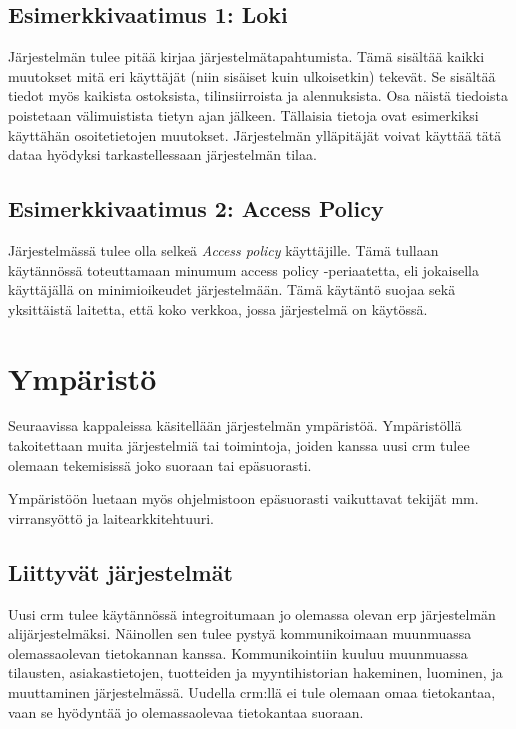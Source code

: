     \subsection{Esimerkkivaatimus 1: Loki}
        Järjestelmän tulee pitää kirjaa järjestelmätapahtumista. Tämä sisältää kaikki muutokset mitä eri käyttäjät (niin sisäiset kuin ulkoisetkin) tekevät.
        Se sisältää tiedot myös kaikista ostoksista, tilinsiirroista ja alennuksista. Osa näistä tiedoista poistetaan välimuistista tietyn ajan 
        jälkeen. Tällaisia tietoja ovat esimerkiksi käyttähän osoitetietojen muutokset. Järjestelmän ylläpitäjät voivat käyttää tätä dataa hyödyksi tarkastellessaan 
        järjestelmän tilaa. 
    \subsection{Esimerkkivaatimus 2: Access Policy}
        Järjestelmässä tulee olla selkeä \textit{Access policy} käyttäjille. Tämä tullaan käytännössä toteuttamaan
        minumum access policy -periaatetta, eli jokaisella käyttäjällä on minimioikeudet järjestelmään.
        Tämä käytäntö suojaa sekä yksittäistä laitetta, että koko verkkoa, jossa järjestelmä on käytössä. 
        \cite{kurssi, sommerville}

\section{Ympäristö}     %

    Seuraavissa kappaleissa käsitellään järjestelmän ympäristöä. Ympäristöllä takoitettaan muita järjestelmiä tai toimintoja, joiden kanssa uusi \gls{crm} tulee olemaan tekemisissä joko suoraan tai epäsuorasti.
    
    Ympäristöön luetaan myös ohjelmistoon epäsuorasti vaikuttavat tekijät mm. virransyöttö ja laitearkkitehtuuri.
    \cite{sommerville}

    \subsection{Liittyvät järjestelmät}     %
        Uusi \gls{crm} tulee käytännössä integroitumaan jo olemassa olevan \gls{erp} järjestelmän alijärjestelmäksi. Näinollen sen tulee pystyä kommunikoimaan
         muunmuassa olemassaolevan tietokannan kanssa. Kommunikointiin kuuluu muunmuassa tilausten, asiakastietojen, tuotteiden ja myyntihistorian hakeminen, 
         luominen, ja muuttaminen järjestelmässä. Uudella \gls{crm}:llä ei tule olemaan omaa tietokantaa, vaan se hyödyntää jo olemassaolevaa tietokantaa suoraan. 
         \cite{erp, crm2}

